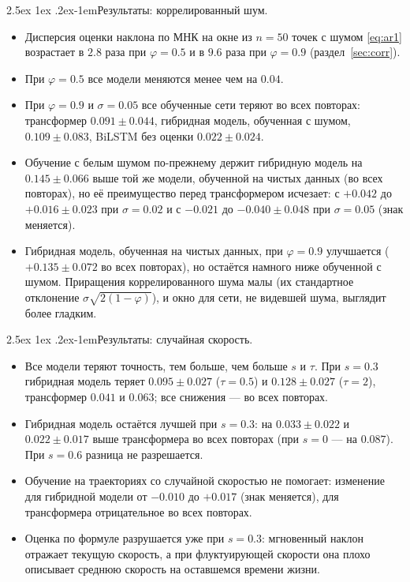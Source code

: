 \documentclass[12pt,a4paper]{report}
\makeatletter
\renewcommand\paragraph{\@startsection{paragraph}{4}{\z@}%
  {2.5ex \@plus1ex \@minus.2ex}{-1em}{\normalfont\normalsize\bfseries}}
\numberwithin{equation}{chapter}
\makeatother
\begin{document}
\paragraph{Результаты: коррелированный шум.}
\begin{itemize}
\item Дисперсия оценки наклона по МНК на окне из $n=50$ точек с шумом
      \eqref{eq:ar1} возрастает в $2.8$ раза при $\varphi=0.5$ и в $9.6$ раза
      при $\varphi=0.9$ (раздел~\ref{sec:corr}).
\item При $\varphi=0.5$ все модели меняются менее чем на $0.04$.
\item При $\varphi=0.9$ и $\sigma=0.05$ все обученные сети теряют во всех
      повторах: трансформер $0.091\pm0.044$, гибридная модель, обученная с
      шумом, $0.109\pm0.083$, BiLSTM без оценки $0.022\pm0.024$.
\item Обучение с белым шумом по-прежнему держит гибридную модель на
      $0.145\pm0.066$ выше той же модели, обученной на чистых данных (во
      всех повторах), но её преимущество перед трансформером исчезает: с
      $+0.042$ до $+0.016\pm0.023$ при $\sigma=0.02$ и с $-0.021$ до
      $-0.040\pm0.048$ при $\sigma=0.05$ (знак меняется).
\item Гибридная модель, обученная на чистых данных, при $\varphi=0.9$
      улучшается ($+0.135\pm0.072$ во всех повторах), но остаётся намного
      ниже обученной с шумом. Приращения коррелированного шума малы (их
      стандартное отклонение $\sigma\sqrt{2(1-\varphi)}$), и окно для сети,
      не видевшей шума, выглядит более гладким.
\end{itemize}

\paragraph{Результаты: случайная скорость.}
\begin{itemize}
\item Все модели теряют точность, тем больше, чем больше $s$ и $\tau$. При
      $s=0.3$ гибридная модель теряет $0.095\pm0.027$ ($\tau=0.5$) и
      $0.128\pm0.027$ ($\tau=2$), трансформер $0.041$ и $0.063$; все
      снижения --- во всех повторах.
\item Гибридная модель остаётся лучшей при $s=0.3$: на $0.033\pm0.022$ и
      $0.022\pm0.017$ выше трансформера во всех повторах (при $s=0$ ---
      на $0.087$). При $s=0.6$ разница не разрешается.
\item Обучение на траекториях со случайной скоростью не помогает:
      изменение для гибридной модели от $-0.010$ до $+0.017$ (знак
      меняется), для трансформера отрицательное во всех повторах.
\item Оценка по формуле разрушается уже при $s=0.3$: мгновенный наклон
      отражает текущую скорость, а при флуктуирующей скорости она плохо
      описывает среднюю скорость на оставшемся времени жизни.
\end{itemize}
\end{document}
